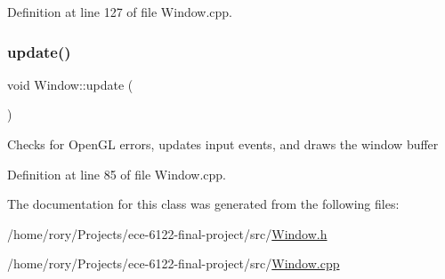 Definition at line 127 of file Window.\+cpp.

\mbox{\label{class_window_a59515fc5a56e86d5a46d771595daac55}} 
\subsubsection{\texorpdfstring{update()}{update()}}
{\footnotesize\ttfamily void Window\+::update (\begin{DoxyParamCaption}{ }\end{DoxyParamCaption})}

Checks for Open\+GL errors, updates input events, and draws the window buffer 

Definition at line 85 of file Window.\+cpp.



The documentation for this class was generated from the following files\+:\begin{DoxyCompactItemize}
\item 
/home/rory/\+Projects/ece-\/6122-\/final-\/project/src/\hyperlink{_window_8h}{Window.\+h}\item 
/home/rory/\+Projects/ece-\/6122-\/final-\/project/src/\hyperlink{_window_8cpp}{Window.\+cpp}\end{DoxyCompactItemize}
